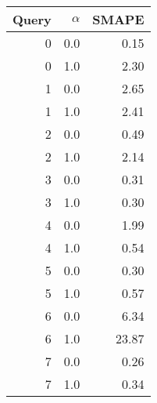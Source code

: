 \begin{tabular}{rrr}
\toprule
 Query &  $\alpha$ &  SMAPE \\
\midrule
     0 &     0.0 &   0.15 \\
     0 &     1.0 &   2.30 \\
     1 &     0.0 &   2.65 \\
     1 &     1.0 &   2.41 \\
     2 &     0.0 &   0.49 \\
     2 &     1.0 &   2.14 \\
     3 &     0.0 &   0.31 \\
     3 &     1.0 &   0.30 \\
     4 &     0.0 &   1.99 \\
     4 &     1.0 &   0.54 \\
     5 &     0.0 &   0.30 \\
     5 &     1.0 &   0.57 \\
     6 &     0.0 &   6.34 \\
     6 &     1.0 &  23.87 \\
     7 &     0.0 &   0.26 \\
     7 &     1.0 &   0.34 \\
\bottomrule
\end{tabular}
